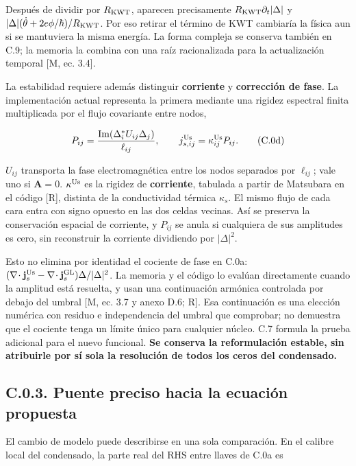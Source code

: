 \documentclass[
  spanish,
  10pt,
  a4paper,
]{article}
\begin{document}
Después de dividir por \(R_{\rm KWT}\), aparecen precisamente
\(R_{\rm KWT}\partial_t|\Delta|\) y
\(|\Delta|(\dot\theta+2e\phi/\hbar)/R_{\rm KWT}\). Por eso retirar el
término de KWT cambiaría la física aun si se mantuviera la misma
energía. La forma compleja se conserva también en C.9; la memoria la
combina con una raíz racionalizada para la actualización temporal {[}M,
ec. 3.4{]}.

La estabilidad requiere además distinguir \textbf{corriente} y
\textbf{corrección de fase}. La implementación actual representa la
primera mediante una rigidez espectral finita multiplicada por el flujo
covariante entre nodos,

\[
P_{ij}=\frac{\operatorname{Im}(\Delta_i^*U_{ij}\Delta_j)}{\ell_{ij}},
\qquad
j_{s,ij}^{\rm Us}=\kappa_{ij}^{\rm Us}P_{ij}.
\tag{C.0d}
\]

\(U_{ij}\) transporta la fase electromagnética entre los nodos separados
por \(\ell_{ij}\); vale uno si \(\mathbf A=0\). \(\kappa^{\rm Us}\) es
la rigidez de \textbf{corriente}, tabulada a partir de Matsubara en el
código {[}R{]}, distinta de la conductividad térmica \(\kappa_s\). El
mismo flujo de cada cara entra con signo opuesto en las dos celdas
vecinas. Así se preserva la conservación espacial de corriente, y
\(P_{ij}\) se anula si cualquiera de sus amplitudes es cero, sin
reconstruir la corriente dividiendo por \(|\Delta|^2\).

Esto no elimina por identidad el cociente de fase en C.0a:
\((\nabla\!\cdot\mathbf j_s^{\rm Us}-\nabla\!\cdot\mathbf j_s^{\rm GL})\Delta/|\Delta|^2\).
La memoria y el código lo evalúan directamente cuando la amplitud está
resuelta, y usan una continuación armónica controlada por debajo del
umbral {[}M, ec. 3.7 y anexo D.6; R{]}. Esa continuación es una elección
numérica con residuo e independencia del umbral que comprobar; no
demuestra que el cociente tenga un límite único para cualquier núcleo.
C.7 formula la prueba adicional para el nuevo funcional. \textbf{Se
conserva la reformulación estable, sin atribuirle por sí sola la
resolución de todos los ceros del condensado.}

\subsection{C.0.3. Puente preciso hacia la ecuación
propuesta}\label{c.0.3.-puente-preciso-hacia-la-ecuaciuxf3n-propuesta}

El cambio de modelo puede describirse en una sola comparación. En el
calibre local del condensado, la parte real del RHS entre llaves de C.0a
es
\end{document}
